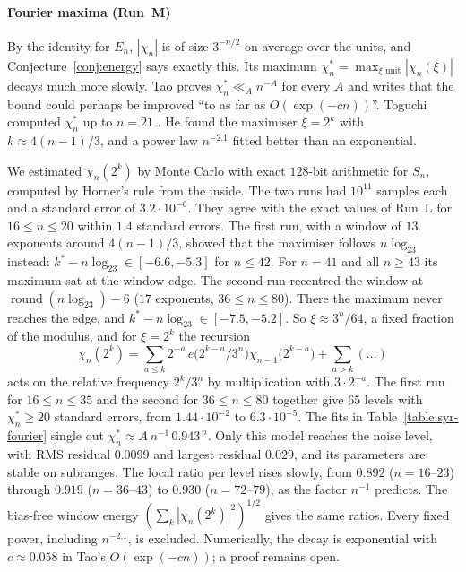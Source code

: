 \documentclass[12pt]{amsart}
\theoremstyle{definition}
\theoremstyle{remark}
\begin{document}
\paragraph{Fourier maxima (Run~M)} By the identity for $E_n$, $|\chi_n|$ is of size $3^{-n/2}$ on average over the units, and Conjecture~\ref{conj:energy} says exactly this. Its maximum $\chi^*_n=\max_{\xi\text{ unit}}|\chi_n(\xi)|$ decays much more slowly. Tao proves $\chi^*_n\ll_An^{-A}$ for every $A$ \cite[Proposition~1.17]{Tao_2022} and writes that the bound could perhaps be improved ``to as far as $O(\exp(-cn))$''. Toguchi computed $\chi^*_n$ up to $n=21$ \cite{Toguchi_2026}. He found the maximiser $\xi=2^k$ with $k\approx4(n-1)/3$, and a power law $n^{-2.1}$ fitted better than an exponential.

We estimated $\chi_n(2^k)$ by Monte Carlo with exact $128$-bit arithmetic for $S_n$, computed by Horner's rule from the inside. The two runs had $10^{11}$ samples each and a standard error of $3.2\cdot10^{-6}$. They agree with the exact values of Run~L for $16\le n\le20$ within $1.4$ standard errors. The first run, with a window of $13$ exponents around $4(n-1)/3$, showed that the maximiser follows $n\log_23$ instead: $k^*-n\log_23\in[-6.6,-5.3]$ for $n\le42$. For $n=41$ and all $n\ge43$ its maximum sat at the window edge. The second run recentred the window at $\operatorname{round}(n\log_23)-6$ ($17$ exponents, $36\le n\le80$). There the maximum never reaches the edge, and $k^*-n\log_23\in[-7.5,-5.2]$. So $\xi\approx3^n/64$, a fixed fraction of the modulus, and for $\xi=2^k$ the recursion
\[
 \chi_n(2^k)=\sum_{a\le k}2^{-a}\,e\bigl(2^{k-a}/3^n\bigr)\chi_{n-1}\bigl(2^{k-a}\bigr)+\sum_{a>k}(\dots)
\]
acts on the relative frequency $2^k/3^n$ by multiplication with $3\cdot2^{-a}$. The first run for $16\le n\le35$ and the second for $36\le n\le80$ together give $65$ levels with $\chi^*_n\ge20$ standard errors, from $1.44\cdot10^{-2}$ to $6.3\cdot10^{-5}$. The fits in Table~\ref{table:syr-fourier} single out $\chi^*_n\approx A\,n^{-1}\,0.943^{\,n}$. Only this model reaches the noise level, with RMS residual $0.0099$ and largest residual $0.029$, and its parameters are stable on subranges. The local ratio per level rises slowly, from $0.892$ ($n=16$--$23$) through $0.919$ ($n=36$--$43$) to $0.930$ ($n=72$--$79$), as the factor $n^{-1}$ predicts. The bias-free window energy $(\sum_k|\chi_n(2^k)|^2)^{1/2}$ gives the same ratios. Every fixed power, including $n^{-2.1}$, is excluded. Numerically, the decay is exponential with $c\approx0.058$ in Tao's $O(\exp(-cn))$; a proof remains open.
\end{document}
